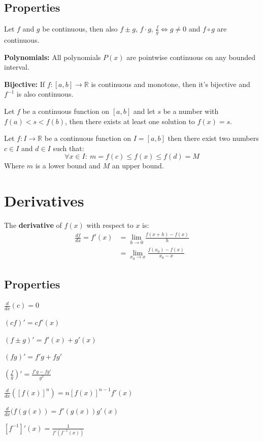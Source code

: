 \documentclass[8pt,a4paper]{extarticle}     %
\theoremstyle{definition}
\theoremstyle{definition}
\theoremstyle{definition}
\newcommand{\R}{\mathbb{R}}
\begin{document}
\begin{multicols}{4}
\subsection{Properties}
Let $f$ and $g$ be continuous, then also $f\pm g$, $f \cdot g$, $\frac{f}{g} \Leftrightarrow g\neq 0$ and $f \circ g$ are continuous.
\begin{eqlist}
	\item \textbf{Polynomials:} All polynomials $P(x)$ are pointwise continuous on any bounded interval.
	\item \textbf{Bijective: } If $f:[a,b]\rightarrow\R$ is continuous and monotone, then it's bijective and $f^{-1}$ is also continuous.
\end{eqlist}

\begin{boxtheorem}
	Let $f$ be a continuous function on $[a,b]$ and let $s$ be a number with $f(a) < s < f(b)$, then there exists at least one solution to $f(x) = s$.
\end{boxtheorem}
\begin{boxtheorem}
	Let $f:I\rightarrow \R$ be a continuous function on $I=[a,b]$ then there exist two numbers $c \in I$ and $d \in I$ such that:
	$$\forall x \in I: \ m = f(c) \leq f(x) \leq f(d) = M$$
	Where $m$ is a lower bound and $M$ an upper bound.
\end{boxtheorem}

\vfill\eject
\columnbreak
\section{Derivatives}
\begin{boxdefinition}[Derivative]
	The \textbf{derivative} of $f(x)$ with respect to $x$ is: \\
	\[
	\begin{split}
		\displaystyle\frac{df}{dx} = f'(x) &= \lim_{h \to 0}\frac{f(x+h)-f(x)}{h}\\
		&=\lim_{x_0 \to x} \frac{f(x_0)-f(x)}{x_0-x}
	\end{split}
	\]
\end{boxdefinition}
\subsection{Properties}
\begin{eqlist}
	\item $\frac{d}{dx}(c) = 0$
	\item $(cf)' = cf'(x)$
	\item $(f\pm g)'= f'(x) + g'(x)$
	\item $(fg)' = f'g + fg'$
	\item $\left(\frac{f}{g}\right)' = \frac{f'g-fg'}{g^2}$
	\item $\frac{d}{dx}\left([f(x)]^n\right) = n[f(x)]^{n-1}f'(x)$
	\item $\frac{d}{dx}(f(g(x)) = f'(g(x))g'(x)$
	\item $[f^{-1}]'(x) = \frac{1}{f'(f^{-1}(x))}$
\end{eqlist}

\end{multicols}
\end{document}
